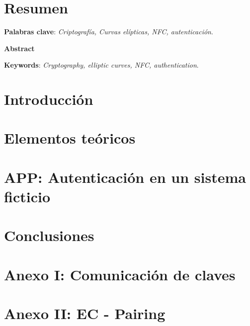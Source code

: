 \documentclass[a4paper,12pt, twoside, openright,makeidx]{book}
\newcommand\blankpage{%
    \null
    \thispagestyle{empty}%
    \addtocounter{page}{-1}%
    \newpage}
\begin{document}
\begingroup
\let\cleardoublepage\clearpage
\listoffigures
\endgroup

\chapter*{Resumen}
\label{Resumen}


\label{Palabras clave}
\begin{center}
\textbf{Palabras clave}: \textit{Criptografía, Curvas elípticas, NFC, autenticación}.
\end{center}

\newpage
\label{Abstract}
\begin{center}
\textbf{Abstract}
\end{center}


\label{Keywords}
\begin{center}
\textbf{Keywords}: \textit{Cryptography, elliptic curves, NFC, authentication}.
\end{center}

\chapter{Introducción}
\label{Introducción}


\chapter{Elementos teóricos}
\label{Elementos teoricos}

%
\chapter{APP: Autenticación en un sistema ficticio}
\label{APP: Autenticación en sistema ficticio}

%
\chapter{Conclusiones}
\label{Conclusiones}


\afterpage{\blankpage}	%
\chapter*{Anexo I: Comunicación de claves}
\label{AnexoI}


\chapter*{Anexo II: EC - Pairing}
\label{AnexoII}




\nocite{*}
\afterpage{\blankpage}	%

\end{document}
